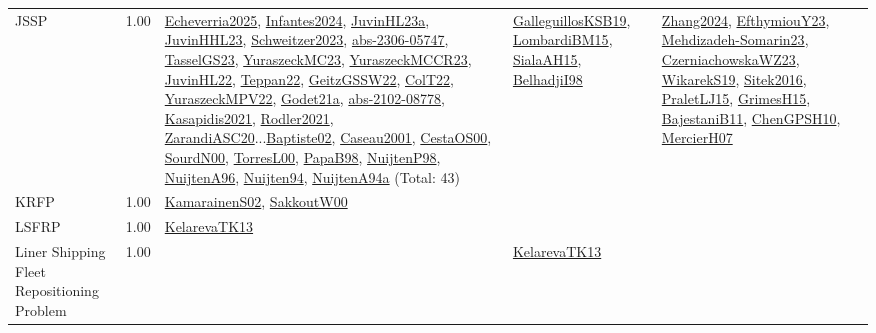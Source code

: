 {\begin{longtable}{p{3cm}r>{\raggedright\arraybackslash}p{6cm}>{\raggedright\arraybackslash}p{6cm}>{\raggedright\arraybackslash}p{8cm}}
\index{JSSP}\index{Classification!JSSP}JSSP &  1.00 & \hyperref[detail:Echeverria2025]{Echeverria2025}, \hyperref[detail:Infantes2024]{Infantes2024}, \hyperref[detail:JuvinHL23a]{JuvinHL23a}, \hyperref[detail:JuvinHHL23]{JuvinHHL23}, \hyperref[detail:Schweitzer2023]{Schweitzer2023}, \hyperref[detail:abs-2306-05747]{abs-2306-05747}, \hyperref[detail:TasselGS23]{TasselGS23}, \hyperref[detail:YuraszeckMC23]{YuraszeckMC23}, \hyperref[detail:YuraszeckMCCR23]{YuraszeckMCCR23}, \hyperref[detail:JuvinHL22]{JuvinHL22}, \hyperref[detail:Teppan22]{Teppan22}, \hyperref[detail:GeitzGSSW22]{GeitzGSSW22}, \hyperref[detail:ColT22]{ColT22}, \hyperref[detail:YuraszeckMPV22]{YuraszeckMPV22}, \hyperref[detail:Godet21a]{Godet21a}, \hyperref[detail:abs-2102-08778]{abs-2102-08778}, \hyperref[detail:Kasapidis2021]{Kasapidis2021}, \hyperref[detail:Rodler2021]{Rodler2021}, \hyperref[detail:ZarandiASC20]{ZarandiASC20}...\hyperref[detail:Baptiste02]{Baptiste02}, \hyperref[detail:Caseau2001]{Caseau2001}, \hyperref[detail:CestaOS00]{CestaOS00}, \hyperref[detail:SourdN00]{SourdN00}, \hyperref[detail:TorresL00]{TorresL00}, \hyperref[detail:PapaB98]{PapaB98}, \hyperref[detail:NuijtenP98]{NuijtenP98}, \hyperref[detail:NuijtenA96]{NuijtenA96}, \hyperref[detail:Nuijten94]{Nuijten94}, \hyperref[detail:NuijtenA94a]{NuijtenA94a} (Total: 43) & \hyperref[detail:GalleguillosKSB19]{GalleguillosKSB19}, \hyperref[detail:LombardiBM15]{LombardiBM15}, \hyperref[detail:SialaAH15]{SialaAH15}, \hyperref[detail:BelhadjiI98]{BelhadjiI98} & \hyperref[detail:Zhang2024]{Zhang2024}, \hyperref[detail:EfthymiouY23]{EfthymiouY23}, \hyperref[detail:Mehdizadeh-Somarin23]{Mehdizadeh-Somarin23}, \hyperref[detail:CzerniachowskaWZ23]{CzerniachowskaWZ23}, \hyperref[detail:WikarekS19]{WikarekS19}, \hyperref[detail:Sitek2016]{Sitek2016}, \hyperref[detail:PraletLJ15]{PraletLJ15}, \hyperref[detail:GrimesH15]{GrimesH15}, \hyperref[detail:BajestaniB11]{BajestaniB11}, \hyperref[detail:ChenGPSH10]{ChenGPSH10}, \hyperref[detail:MercierH07]{MercierH07}\\
\index{KRFP}\index{Classification!KRFP}KRFP &  1.00 & \hyperref[detail:KamarainenS02]{KamarainenS02}, \hyperref[detail:SakkoutW00]{SakkoutW00} &  & \\
\index{LSFRP}\index{Classification!LSFRP}LSFRP &  1.00 & \hyperref[detail:KelarevaTK13]{KelarevaTK13} &  & \\
\index{Liner Shipping Fleet Repositioning Problem}\index{Classification!Liner Shipping Fleet Repositioning Problem}Liner Shipping Fleet Repositioning Problem &  1.00 &  & \hyperref[detail:KelarevaTK13]{KelarevaTK13} & \\

\end{longtable}}
